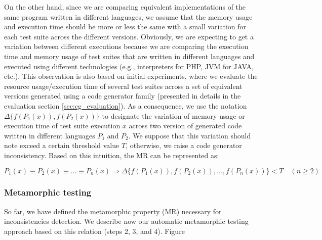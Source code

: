 On the other hand, since we are comparing equivalent implementations of the same program written in different languages, we assume that the memory usage and execution time should be more or less the same with a small variation for each test suite across the different versions. Obviously, we are expecting to get a variation between different executions because we are comparing the execution time and memory usage of test suites that are written in different languages and executed using different technologies (e.g., interpreters for PHP, JVM for JAVA, etc.). 
This observation is also based on initial experiments, where we evaluate the resource usage/execution time of several test suites across a set of equivalent versions generated using a code generator family (presented in details in the evaluation section \ref{sec:cg_evaluation}). As a consequence, we use the notation $\Delta\{f(P_{1}(x)), f(P_{2}(x))\}$ to designate the variation of memory usage or execution time of test suite execution $x$ across two version of generated code written in different languages $P_{1}$ and $P_{2}$. We suppose that this variation should note exceed a certain threshold value $T$, otherwise, we raise a code generator inconsistency.
Based on this intuition, the MR can be represented as:

\begin{equation}
P_{1}(x) \equiv P_{2}(x) \equiv ... \equiv P_{n}(x) \Rightarrow \Delta\{f(P_{1}(x)), f(P_{2}(x)),..., f(P_{n}(x))\} < T\quad (n\geqslant 2)
\end{equation}


\subsubsection[(Steps 2, 3, and 4)]{Metamorphic testing}
So far, we have defined the metamorphic property (MR) necessary for inconsistencies detection. We describe now our automatic metamorphic testing approach based on this relation (steps 2, 3, and 4). 
Figure 

